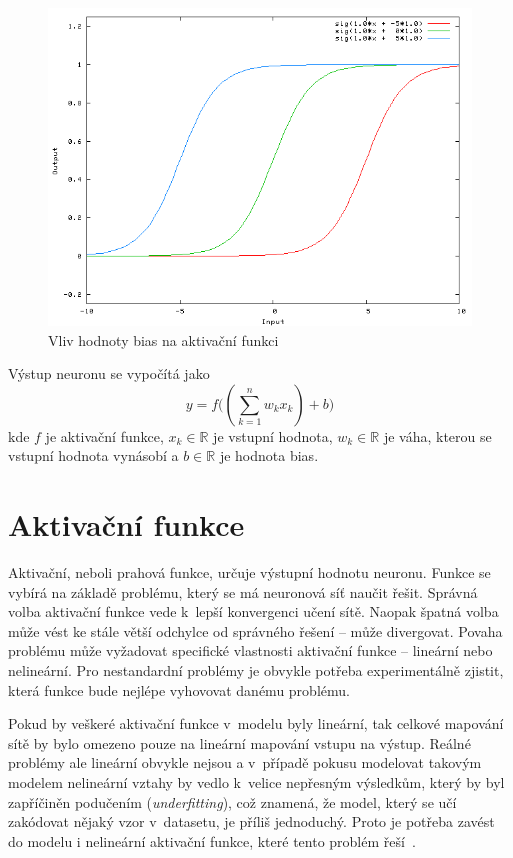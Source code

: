 \begin{figure}[H]
    \centering
    \includegraphics[scale=0.4]{obrazky-figures/bias.png}
    \caption{\label{fig:bias}Vliv hodnoty bias na aktivační funkci}
\end{figure}


Výstup neuronu se vypočítá jako
\begin{equation}
	y = f\Big((\sum_{k=1}^n w_kx_k) + b\Big)
\end{equation}
kde $f$ je aktivační funkce, $x_k \in \mathbb{R}$ je vstupní hodnota, $w_k \in \mathbb{R}$ je váha, kterou se vstupní hodnota vynásobí a $b \in \mathbb{R}$ je hodnota bias.


\section{Aktivační funkce}
Aktivační, neboli prahová funkce, určuje výstupní hodnotu neuronu. Funkce se vybírá na základě problému, který se má neuronová síť naučit řešit. Správná volba aktivační funkce vede k~lepší konvergenci učení sítě. Naopak špatná volba může vést ke stále větší odchylce od správného řešení -- může divergovat. Povaha problému může vyžadovat specifické vlastnosti aktivační funkce -- lineární nebo nelineární. Pro nestandardní problémy je obvykle potřeba experimentálně zjistit, která funkce bude nejlépe vyhovovat danému problému. 

Pokud by veškeré aktivační funkce v~modelu byly lineární, tak celkové mapování sítě by bylo omezeno pouze na lineární mapování vstupu na výstup. Reálné problémy ale lineární obvykle nejsou a v~případě pokusu modelovat takovým modelem nelineární vztahy by vedlo k~velice nepřesným výsledkům, který by byl zapříčiněn podučením (\textit{underfitting}), což znamená, že model, který se učí zakódovat nějaký vzor v~datasetu, je příliš jednoduchý. Proto je potřeba zavést do modelu i nelineární aktivační funkce, které tento problém řeší~\cite{mitdeeplearning_small}.

